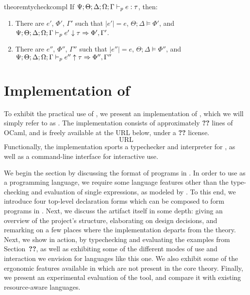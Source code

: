 \begin{restatable}{theorem}{tycheckcompl}
If $\Psi;\Theta;\Delta;\Omega;\Gamma \vdash_p e : \tau$, then:
\begin{enumerate}
  \item There are $e'$, $\Phi'$, $\Gamma'$ such that $|e'| = e$, $\Theta ; \Delta \vDash \Phi'$, and $\Psi;\Theta;\Delta;\Omega;\Gamma \vdash_p e' \downarrow \tau \Rightarrow \Phi', \Gamma'$.
  \item There are $e''$, $\Phi''$, $\Gamma''$ such that $|e''| = e$, $\Theta ; \Delta \vDash \Phi''$, and $\Psi;\Theta;\Delta;\Omega;\Gamma \vdash_p e'' \uparrow \tau \Rightarrow \Phi'',\Gamma''$
\end{enumerate}
\label{thm:tycheck-compl}
\end{restatable}


\section{Implementation of \lambdaamor}
\label{sec:lambdaamor-impl}
To exhibit the practical use of \dlambdaamor, we present an implementation of \bilambdaamor, which we will simply refer to as \lambdaamorimpl. The implementation consists of approximately \textbf{??} lines of OCaml, and is freely available at the URL below, under a \textbf{??} license.
$$
\text{URL}
$$
Functionally, the implementation sports a typechecker and interpreter for \dlambdaamor, as well as a command-line interface for interactive use.

We begin the section by discussing the format of programs in \lambdaamorimpl. In order to use \lambdaamorimpl as a programming language, we require some language features other than the type-checking and evaluation of single expressions, as modeled by \bilambdaamor. To this end, we introduce four top-level declaration forms which can be composed to form programs in \lambdaamorimpl. Next, we discuss the artifact itself in some depth: giving an overview of the project's structure, elaborating on design decisions, and remarking on a few places where the implementation departs from the theory.
 Next, we show \lambdaamorimpl in action, by typechecking and evaluating the examples from Section~\textbf{??}, as well as exhibiting some of the different modes of use and interaction we envision for languages like this one. We also exhibit some of the ergonomic features available in \lambdaamorimpl which are not present in the core theory. Finally, we present an experimental evaluation of the tool, and compare it with existing resource-aware languages.
 

